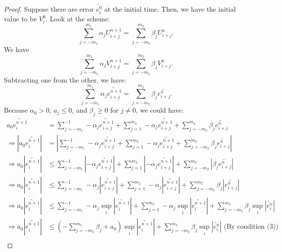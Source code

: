\begin{answer}
    \begin{proof}
        Suppose there are error $\widetilde{e_i^0}$ at the initial time. Then, we have the initial value to be $V_i^0$. Look at the scheme:
        $$
            \sum_{j=-m_1}^{m_1} \alpha_j U_{i+j}^{n+1}=\sum_{j=-m_2}^{m_2} \beta_j U_{i+j}^n .
        $$
        We have
        $$
            \sum_{j=-m_1}^{m_1} \alpha_j V_{i+j}^{n+1}=\sum_{j=-m_2}^{m_2} \beta_j V_{i+j}^n .
        $$
        Subtracting one from the other, we have:
        $$
            \sum_{j=-m_1}^{m_1} \alpha_j \widetilde{e_{i+j}^{n+1}}=\sum_{j=-m_2}^{m_2} \beta_j \widetilde{e_{i+j}^n} .
        $$
        Because $\alpha_0 > 0$, $a_j \leq 0$, and $\beta_j \geqslant 0$ for $j \neq 0$, we could have:
        $$
            \begin{aligned}
                a_0 \widetilde{e_{i}^{n+1}} &= \sum_{j=-m_1}^{-1} -\alpha_j \widetilde{e_{i+j}^{n+1}} + \sum_{j=1}^{m_2} -\alpha_j \widetilde{e_{i+j}^{n+1}} + \sum_{j=-m_2}^{m_2} \beta_j \widetilde{e_{i+j}^n}\\
                \Rightarrow \left\lvert a_0 \widetilde{e_{i}^{n+1}} \right\lvert &= \left\lvert \sum_{j=-m_1}^{-1} -\alpha_j \widetilde{e_{i+j}^{n+1}} + \sum_{j=1}^{m_2} -\alpha_j \widetilde{e_{i+j}^{n+1}} + \sum_{j=-m_2}^{m_2} \beta_j \widetilde{e_{i+j}^n}\right\rvert\\
                \Rightarrow a_0 \left\lvert \widetilde{e_{i}^{n+1}} \right\lvert &\leq  \sum_{j=-m_1}^{-1} \left\lvert-\alpha_j \widetilde{e_{i+j}^{n+1}}\right\rvert + \sum_{j=1}^{m_2} \left\lvert-\alpha_j \widetilde{e_{i+j}^{n+1}}\right\rvert + \sum_{j=-m_2}^{m_2} \left\lvert\beta_j \widetilde{e_{i+j}^n}\right\rvert\\
                \Rightarrow a_0 \left\lvert \widetilde{e_{i}^{n+1}} \right\lvert &\leq  \sum_{j=-m_1}^{-1} -\alpha_j\left\lvert \widetilde{e_{i+j}^{n+1}}\right\rvert + \sum_{j=1}^{m_2} -\alpha_j \left\lvert\widetilde{e_{i+j}^{n+1}}\right\rvert + \sum_{j=-m_2}^{m_2} \beta_j\left\lvert \widetilde{e_{i+j}^n}\right\rvert\\
                \Rightarrow a_0 \left\lvert \widetilde{e_{i}^{n+1}} \right\lvert &\leq  \sum_{j=-m_1}^{-1} -\alpha_j\sup_{i}\left\lvert \widetilde{e_{i}^{n+1}}\right\rvert + \sum_{j=1}^{m_2} -\alpha_j \sup_{i}\left\lvert\widetilde{e_{i}^{n+1}}\right\rvert + \sum_{j=-m_2}^{m_2} \beta_j\sup_{i}\left\lvert \widetilde{e_{i}^n}\right\rvert\\
                \Rightarrow a_0 \left\lvert \widetilde{e_{i}^{n+1}} \right\lvert &\leq  (-\sum_{j=-m_2}^{m_2} \beta_j+a_0)\sup_{i}\left\lvert \widetilde{e_{i}^{n+1}}\right\rvert + \sum_{j=-m_2}^{m_2} \beta_j\sup_{i}\left\lvert \widetilde{e_{i}^n}\right\rvert \text{ (By condition (3))}\\

\end{aligned}$$
\end{proof}
\end{answer}
